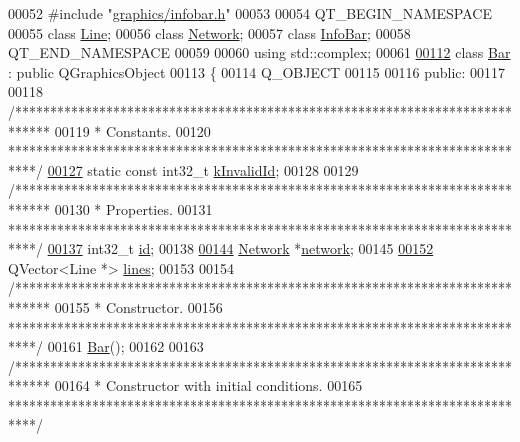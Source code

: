 \begin{DoxyCode}
00052 \textcolor{preprocessor}{#include "\hyperlink{infobar_8h}{graphics/infobar.h}"}
00053 
00054 QT\_BEGIN\_NAMESPACE
00055 \textcolor{keyword}{class }\hyperlink{class_line}{Line};
00056 \textcolor{keyword}{class }\hyperlink{class_network}{Network};
00057 \textcolor{keyword}{class }\hyperlink{class_info_bar}{InfoBar};
00058 QT\_END\_NAMESPACE
00059 
00060 \textcolor{keyword}{using} std::complex;
00061 
\hypertarget{bar_8h_source_l00112}{}\hyperlink{class_bar}{00112} \textcolor{keyword}{class }\hyperlink{class_bar}{Bar} : \textcolor{keyword}{public} QGraphicsObject
00113 \{
00114   Q\_OBJECT
00115 
00116 \textcolor{keyword}{public}:
00117 
00118   \textcolor{comment}{/*****************************************************************************}
00119 \textcolor{comment}{   * Constants.}
00120 \textcolor{comment}{   ****************************************************************************/}
\hypertarget{bar_8h_source_l00127}{}\hyperlink{group___models_ga9919592c0397ed41448dfb20b607d738}{00127}   \textcolor{keyword}{static} \textcolor{keyword}{const} int32\_t \hyperlink{group___models_ga9919592c0397ed41448dfb20b607d738}{kInvalidId};
00128 
00129   \textcolor{comment}{/*****************************************************************************}
00130 \textcolor{comment}{   * Properties.}
00131 \textcolor{comment}{   ****************************************************************************/}
\hypertarget{bar_8h_source_l00137}{}\hyperlink{class_bar_a9dc5c6a6d44fe412ae34ef8a881b8dce}{00137}   int32\_t \hyperlink{class_bar_a9dc5c6a6d44fe412ae34ef8a881b8dce}{id};
00138 
\hypertarget{bar_8h_source_l00144}{}\hyperlink{class_bar_a80025f13884750add58cc61b318357ff}{00144}   \hyperlink{class_network}{Network} *\hyperlink{class_bar_a80025f13884750add58cc61b318357ff}{network};
00145 
\hypertarget{bar_8h_source_l00152}{}\hyperlink{class_bar_a23b6d4319352ef0e77ad66aade4e0209}{00152}   QVector<Line *> \hyperlink{class_bar_a23b6d4319352ef0e77ad66aade4e0209}{lines};
00153 
00154   \textcolor{comment}{/*****************************************************************************}
00155 \textcolor{comment}{   * Constructor.}
00156 \textcolor{comment}{   ****************************************************************************/}
00161   \hyperlink{group___models_ga9cae2188fcc6cce41caa7898c64548d1}{Bar}();
00162 
00163   \textcolor{comment}{/*****************************************************************************}
00164 \textcolor{comment}{   * Constructor with initial conditions.}
00165 \textcolor{comment}{   ****************************************************************************/}

\end{DoxyCode}
